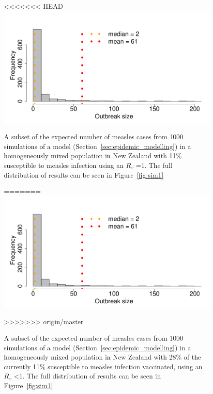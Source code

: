 \documentclass{article}
\begin{document}
\begin{itemize}
\begin{figure}
     \centering
<<<<<<< HEAD
\includegraphics{draftfinalreport-063}
     \caption{A subset of the expected number of measles cases from 1000 simulations of a model (Section~\ref{sec:epidemic_modelling}) in a homogeneously mixed population in New Zealand with 11\% susceptible to measles infection using an $R_v$ =1. The full distribution of results can be seen in Figure~\ref{fig:sim1}}
=======
\includegraphics{draftfinalreport-062}
     \caption{A subset of the expected number of measles cases from 1000 simulations of a model (Section~\ref{sec:epidemic_modelling}) in a homogeneously mixed population in New Zealand with 28\% of the currently 11\% susceptible to measles infection vaccinated, using an $R_v$ <1. The full distribution of results can be seen in Figure~\ref{fig:sim1}}
>>>>>>> origin/master
     \label{fig:sim}
\end{figure}


\end{itemize}
\end{document}

